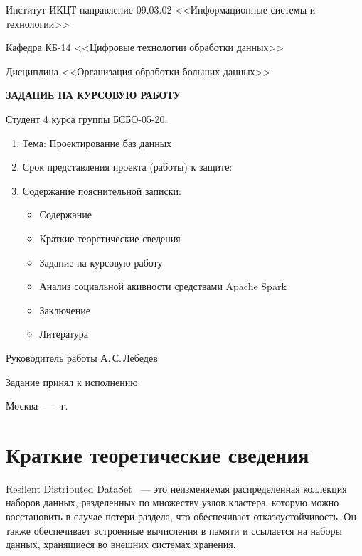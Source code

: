 \begin{titlepage}
	Институт ИКЦТ направление 09.03.02 <<Информационные системы и технологии>>
	
	Кафедра КБ-14 <<Цифровые технологии обработки данных>>
	
	Дисциплина <<Организация обработки больших данных>>
	
	\begin{center}
		\vspace*{1cm}
		{\fontsize{16pt}{16pt}\selectfont
			\textbf{ЗАДАНИЕ НА КУРСОВУЮ РАБОТУ}} \par
	\end{center}
	
	Студент 4 курса группы БСБО-05-20.
	
	\begin{enumerate}
		\item Тема: Проектирование баз данных
		\item Срок представления проекта (работы) к защите:
		\item Содержание пояснительной записки:
		\begin{itemize}
			\item Содержание
			\item Краткие теоретические сведения
			\item Задание на курсовую работу
			\item Анализ социальной акивности средствами Apache Spark
			\item Заключение
			\item Литература
		\end{itemize}
	\end{enumerate}
	
	Руководитель работы \underline{А.\,С.\,Лебедев}
	
	Задание принял к исполнению \underline{\studentname}
	
	\begin{center}
		\vfill Москва~--- \the\year{}~г.
	\end{center}
\end{titlepage}
\addtocounter{page}{3}


\tableofcontents

\section{Краткие теоретические сведения}

Resilent Distributed DataSet~\cite{bib:rdd1, bib:rdd2, bib:rdd3} --- это неизменяемая распределенная коллекция наборов данных, разделенных по множеству узлов кластера, которую можно восстановить в случае потери раздела, что обеспечивает отказоустойчивость. Он также обеспечивает встроенные вычисления в памяти и ссылается на наборы данных, хранящиеся во внешних системах хранения.

